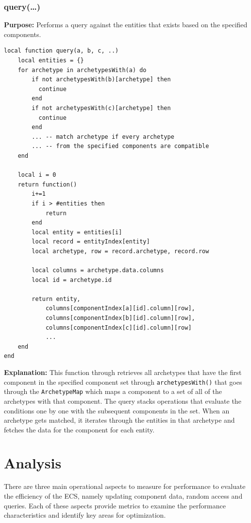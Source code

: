 \documentclass[openany, amssymb, psamsfonts]{amsart}
\theoremstyle{definition}
\numberwithin{equation}{section}
\begin{document}
\subsubsection{query(\ldots)}
\textbf{Purpose:} Performs a query against the entities that exists based on the specified components.
\begin{lstlisting}[style=lua]
  local function query(a, b, c, ..) 
    local entities = {}
    for archetype in archetypesWith(a) do 
        if not archetypesWith(b)[archetype] then  
          continue 
        end
        if not archetypesWith(c)[archetype] then 
          continue 
        end
        ... -- match archetype if every archetype 
        ... -- from the specified components are compatible
    end

    local i = 0
    return function() 
        i+=1
        if i > #entities then 
            return
        end
        local entity = entities[i]
        local record = entityIndex[entity]
        local archetype, row = record.archetype, record.row

        local columns = archetype.data.columns
        local id = archetype.id
        
        return entity,
            columns[componentIndex[a][id].column][row], 
            columns[componentIndex[b][id].column][row],
            columns[componentIndex[c][id].column][row]
            ...
    end
end

\end{lstlisting}
\textbf{Explanation:} 
This function through retrieves all archetypes that have the first component 
in the specified component set through \texttt{archetypesWith()} that goes through the 
\texttt{ArchetypeMap} which maps a component to a set of all of the archetypes with that component. The query stacks 
operations that evaluate the conditions one by one with the subsequent components in the set. 
When an archetype gets matched, it iterates through the entities in that archetype and fetches 
the data for the component for each entity.

\section{Analysis}
There are three main operational aspects to measure for performance to evaluate the efficiency 
of the ECS, namely updating component data, random access and queries. Each of these aspects provide
metrics to examine the performance characteristics and identify key areas for optimization.
\end{document}
